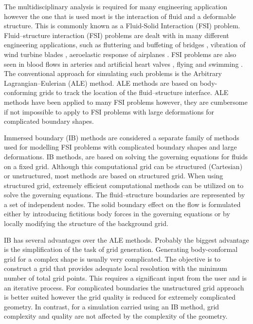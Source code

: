 The multidisciplinary analysis is required for many engineering application however the one that is used most is the interaction of fluid and a deformable structure. This is commonly known as a Fluid-Solid Interaction (FSI) problem. Fluid–structure interaction (FSI) problems are dealt with in many different engineering applications, such as fluttering and buffeting of bridges \cite{jain1996coupled}, vibration of wind turbine blades \cite{arrigan2011control}, aeroelastic response of airplanes \cite{farhat2006provably}. FSI problems are also seen in blood flows in arteries and artificial heart valves \cite{sotiropoulos2009review}, flying and swimming \cite{kern2006simulations}. The conventional approach for simulating such problems is the Arbitrary Lagrangian–Eulerian (ALE) method. ALE methods are based on body- conforming grids to track the location of the fluid–structure interface. ALE methods have been applied to many FSI problems however, they are cumbersome if not impossible to apply to FSI problems with large deformations for complicated boundary shapes.

Immersed boundary (IB) methods are considered a separate family of methods used for modelling FSI problems with complicated boundary shapes and large deformations. IB methods, are based on solving the governing equations for fluids on a fixed grid. Although this computational grid can be structured (Cartesian) or unstructured, most methods are based on structured grid. When using structured grid, extremely efficient computational methods can be utilized on to solve the governing equations. The fluid–structure boundaries are represented by a set of independent nodes. The solid boundary effect on the flow is formulated either by introducing fictitious body forces in the governing equations or by locally modifying the structure of the background grid.

IB has several advantages over the ALE methods. Probably the biggest advantage is the simplification of the task of grid generation. Generating body-conformal grid for a complex shape is usually very complicated. The objective is to construct a grid that provides adequate local resolution with the minimum number of total grid points.  This requires a significant input from the user and is an iterative process. For complicated boundaries the unstructured grid approach is better suited however the grid quality is reduced for extremely complicated geometry. In contrast, for a simulation carried using an IB method, grid complexity and quality are not affected by the complexity of the geometry. 

